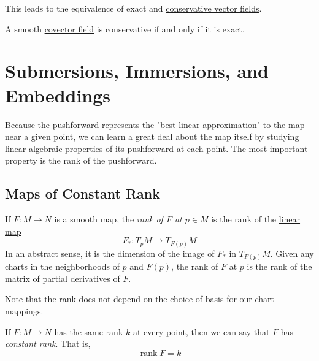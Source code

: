 \documentclass{article}
\DeclareMathOperator{\rank}{rank}
\newcounter{theorem}[section]
\newcounter{definition}[section]
\begin{document}
    This leads to the equivalence of exact and \hyperref[mv-def:conservative-vector-fields]{conservative vector fields}. 

    \begin{theorem}
      \label{thm:conservative-is-equivalent-to-exact}
    A smooth \hyperref[def:covector-field]{covector field} is conservative if and only if it is exact. 
    \end{theorem}

\section{Submersions, Immersions, and Embeddings}

  Because the pushforward represents the "best linear approximation" to the map near a given point, we can learn a great deal about the map itself by studying linear-algebraic properties of its pushforward at each point. The most important property is the rank of the pushforward. 

  \subsection{Maps of Constant Rank}

    \begin{definition}[Rank of $F$ at $p$]
      \label{def:rank-of-f-at-p}
    If $F: M \to N$ is a smooth map, the \textit{rank of $F$ at $p \in M$} is the rank of the \hyperref[lin-def:linear_map]{linear map} 
    \begin{equation}
      F_*: T_p M \to T_{F(p)}M
    \end{equation}
    In an abstract sense, it is the dimension of the image of $F_*$ in $T_{F(p)} M$. Given any charts in the neighborhoods of $p$ and $F(p)$, the rank of $F$ at $p$ is the rank of the matrix of \hyperref[mv-def:partial-derivative]{partial derivatives} of $F$. 
    \end{definition}

    Note that the rank does not depend on the choice of basis for our chart mappings. 

    \begin{definition}
      \label{def:constant-rank}
    If $F: M \to N$ has the same rank $k$ at every point, then we can say that $F$ has \textit{constant rank}. That is, 
    \begin{equation}
      \rank{F} = k
    \end{equation}
    \end{definition}
\end{document}
